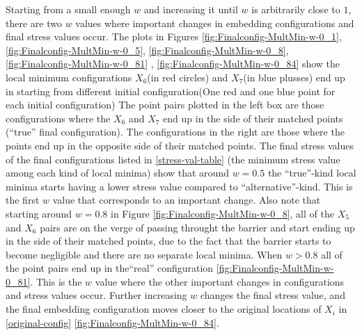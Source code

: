 \documentclass[12pt,oneside,final]{thesis}\usepackage[]{graphicx}\usepackage[]{color}
\begin{document}
Starting from a small enough $w$ and increasing it until $w$ is arbitrarily close to $1$, there are two $w$ values where important changes in embedding configurations and final stress values occur.
The plots in Figures \ref{fig:Finalconfig-MultMin-w-0_1}, \ref{fig:Finalconfig-MultMin-w-0_5}, \ref{fig:Finalconfig-MultMin-w-0_8}, \ref{fig:Finalconfig-MultMin-w-0_81} , \ref{fig:Finalconfig-MultMin-w-0_84} show the local minimum configurations ${X}_6$(in red circles) and ${X}_7$(in blue plusses) end up in starting from different initial configuration(One red and one blue point for each  initial configuration) The point pairs plotted in the left box are those configurations  where the  ${X}_6$ and ${X}_7$ end up in the side of their matched points (``true'' final configuration). The configurations in the right are those where the points end up in the opposite side of their matched points. The final stress values of the final configurations listed in  \ref{stress-val-table} (the minimum stress value among each kind of local minima) show that around $w=0.5$ the  ``true''-kind local minima   starts having a lower stress value compared to ``alternative''-kind. This is the first $w$ value that corresponds to an important change. Also note that starting around $w=0.8$ in Figure \ref{fig:Finalconfig-MultMin-w-0_8}, all of the $X_5$ and $X_6$  pairs are on the verge of passing throught the barrier and start ending up in the side of their matched points, due to the fact that the barrier starts to become negligible and there are no separate local minima. When $w>0.8$ all of the point pairs end up in  the``real'' configuration \ref{fig:Finalconfig-MultMin-w-0_81}. This is the $w$ value where the other important changes in configurations and stress values occur. Further increasing $w$ changes the final stress value, and  the final embedding configuration moves closer to the original locations of $X_{i}$ in \ref{original-config} \ref{fig:Finalconfig-MultMin-w-0_84}.
\end{document}
